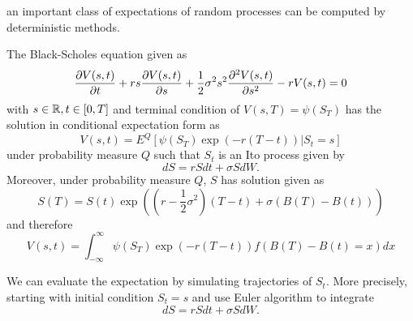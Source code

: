 \begin{refsection}
\begin{remark}
	an important class of expectations of random processes can be computed by deterministic methods.
\end{remark}


\begin{corollary}
	The Black-Scholes equation given as
	$$\frac{\partial V(s,t)}{\partial t} + rs\frac{\partial V(s,t)}{\partial s} + \frac{1}{2}\sigma^2 s^2 \frac{\partial^2 V(s,t)}{\partial s^2} - rV(s,t) = 0$$
	with $s\in \mathbb{R},t\in [0,T]$ and terminal condition of $V(s,T) = \psi(S_T)$
	has the solution in conditional expectation form as
	$$V(s,t) = E^Q[\psi(S_T)\exp(-r(T-t)) |S_t = s]$$
	under probability measure $Q$ such that $S_t$ is an Ito process given by
	$$dS = rSdt + \sigma S dW.$$
	Moreover, under probability measure $Q$, $S$ has solution given as
	$$S(T) = S(t)\exp((r-\frac{1}{2}\sigma^2)(T-t) + \sigma(B(T)-B(t)))$$
	and therefore
	$$V(s,t) = \int_{-\infty}^\infty \psi(S_T)\exp(-r(T-t)) f(B(T)-B(t) = x)dx$$
\end{corollary}





\begin{remark}
	We can evaluate the expectation by simulating trajectories of $S_t$. More precisely, starting with initial condition $S_t = s$ and use Euler algorithm to integrate 
	$$dS = rSdt + \sigma S dW.$$
\end{remark}


\end{refsection}
